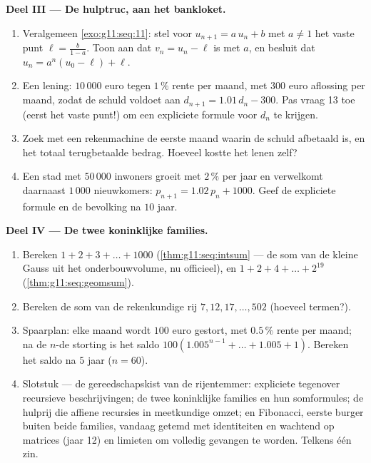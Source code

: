 \begin{problem}
\medskip
\noindent\textbf{Deel III --- De hulptruc, aan het bankloket.}
\begin{enumerate}[resume]
  \item Veralgemeen \cref{exo:g11:seq:11}: stel voor $u_{n+1} = a\,u_n + b$
        met $a \neq 1$ het vaste punt $\ell = \frac{b}{1 - a}$. Toon aan dat
        $v_n = u_n - \ell$  is met  $a$, en besluit dat
        $u_n = a^n (u_0 - \ell) + \ell$.
  \item Een lening: $10\,000$ euro tegen $1\,\%$ rente per maand, met
        $300$ euro aflossing per maand, zodat de schuld voldoet aan
        $d_{n+1} = 1.01\,d_n - 300$. Pas vraag 13 toe (eerst het vaste punt!)
        om een expliciete formule voor $d_n$ te krijgen.
  \item Zoek met een rekenmachine de eerste maand waarin de schuld afbetaald
        is, en het totaal terugbetaalde bedrag. Hoeveel kostte het lenen
        zelf?
  \item Een stad met $50\,000$ inwoners groeit met $2\,\%$ per jaar en
        verwelkomt daarnaast $1\,000$ nieuwkomers: $p_{n+1} = 1.02\,p_n +
        1000$. Geef de expliciete formule en de bevolking na $10$ jaar.
\end{enumerate}

\medskip
\noindent\textbf{Deel IV --- De twee koninklijke families.}
\begin{enumerate}[resume]
  \item Bereken $1 + 2 + 3 + \dots + 1000$ (\cref{thm:g11:seq:intsum} --- de
        som van de kleine Gauss uit het onderbouwvolume, nu officieel), en
        $1 + 2 + 4 + \dots + 2^{19}$ (\cref{thm:g11:seq:geomsum}).
  \item Bereken de som van de rekenkundige rij $7, 12, 17, \dots, 502$
        (hoeveel termen?).
  \item Spaarplan: elke maand wordt $100$ euro gestort, met $0.5\,\%$ rente
        per maand; na de $n$-de storting is het saldo
        $100\left(1.005^{n-1} + \dots + 1.005 + 1\right)$. Bereken het saldo
        na $5$ jaar ($n = 60$).
  \item Slotstuk --- de gereedschapskist van de rijentemmer: expliciete
        tegenover recursieve beschrijvingen; de twee koninklijke families en
        hun somformules; de hulprij die affiene recursies in meetkundige
        omzet; en Fibonacci, eerste burger buiten beide families, vandaag
        getemd met identiteiten en wachtend op matrices (jaar 12) en limieten
        om volledig gevangen te worden. Telkens één zin.
\end{enumerate}
\end{problem}
